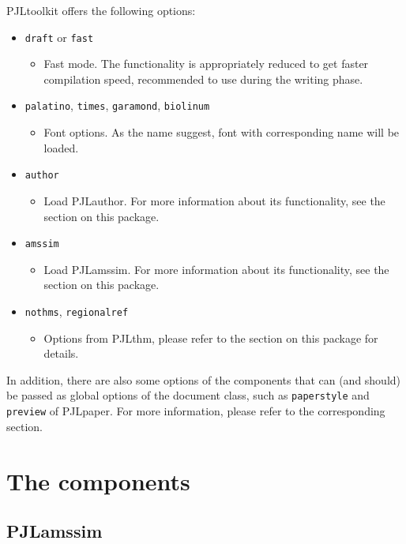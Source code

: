 \documentclass[allowbf]{lebhart}
\providecommand{\PJLtoolkit}{\textsf{PJLtoolkit}}
\providecommand{\PJLamssim}{\textsf{PJLamssim}}
\providecommand{\PJLauthor}{\textsf{PJLauthor}}
\providecommand{\PJLpaper}{\textsf{PJLpaper}}
\providecommand{\PJLthm}{\textsf{PJLthm}}
\begin{document}
\PJLtoolkit{} offers the following options:
\begin{itemize}
    \item \texttt{draft} or \texttt{fast}
        \begin{itemize}
            \item Fast mode. The functionality is appropriately reduced to get faster compilation speed, recommended to use during the writing phase.
        \end{itemize}
    \item \texttt{palatino}, \texttt{times}, \texttt{garamond}, \texttt{biolinum}
        \begin{itemize}
            \item Font options. As the name suggest, font with corresponding name will be loaded.
        \end{itemize}
    \item \texttt{author}
        \begin{itemize}
            \item Load \PJLauthor{}. For more information about its functionality, see the section on this package.
        \end{itemize}
    \item \texttt{amssim}
        \begin{itemize}
            \item Load \PJLamssim{}. For more information about its functionality, see the section on this package.
        \end{itemize}
    \item \texttt{nothms}, \texttt{regionalref}
        \begin{itemize}
            \item Options from \PJLthm{}, please refer to the section on this package for details.
        \end{itemize}
\end{itemize}
In addition, there are also some options of the components that can (and should) be passed as global options of the document class, such as \texttt{paperstyle} and \texttt{preview} of \PJLpaper{}. For more information, please refer to the corresponding section.

\section{The components}

\subsection{PJLamssim}
\end{document}
